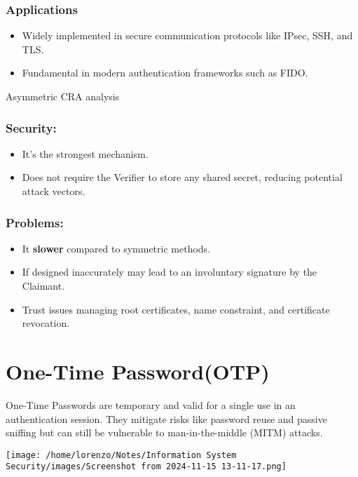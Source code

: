 \subsubsection{Applications}
\begin{itemize}
    \item  Widely implemented in secure communication protocols like IPsec, SSH, and TLS.
    \item Fundamental in modern authentication frameworks such as FIDO.
\end{itemize}
\begin{quotebox}[colframe=blue!10!white, colback=blue!5!white]{Asymmetric CRA analysis}
    \begin{minipage}{0.5\textwidth}
        \vspace{-1.1cm}
        \subsubsection{Security:}
        \begin{itemize}
            \item It's the strongest mechanism.
            \item Does not require the Verifier to store any shared secret, reducing potential attack vectors.
        \end{itemize}
     \end{minipage} 
     \hspace{0cm}
     \begin{minipage}{0.5\textwidth}
        \subsubsection{Problems:}
        \begin{itemize}
            \item It \textbf{slower} compared to symmetric methods.
            \item If designed inaccurately may lead to an involuntary signature
            by the Claimant.
            \item Trust issues managing root certificates, name constraint, and certificate revocation.
        \end{itemize}
     \end{minipage}
\end{quotebox}

\section{One-Time Password(OTP)}
\begin{minipage}{0.5\textwidth}
One-Time Passwords are temporary and valid for a single use in an authentication session. They mitigate risks like password reuse and passive sniffing but can still be vulnerable to man-in-the-middle (MITM) attacks. 
\end{minipage} 
\hspace{1cm}
\begin{minipage}{0.5\textwidth}
    \centering
    \texttt{[image: /home/lorenzo/Notes/Information System Security/images/Screenshot from 2024-11-15 13-11-17.png]}
\end{minipage}